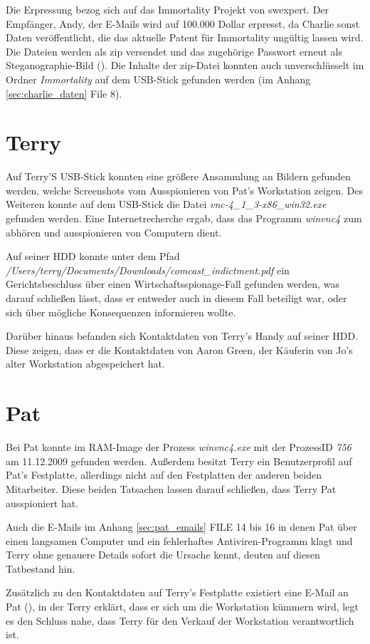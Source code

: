 Die Erpressung bezog sich auf das Immortality Projekt von swexpert. Der Empfänger, Andy, der E-Mails wird auf 100.000 Dollar erpresst, da Charlie sonst Daten veröffentlicht, die das aktuelle Patent für Immortality ungültig lassen wird. Die Dateien werden als zip versendet und das zugehörige Passwort erneut als Steganographie-Bild (). Die Inhalte der zip-Datei konnten auch unverschlüsselt im Ordner \textit{Immortality} auf dem USB-Stick gefunden werden (im Anhang \ref{sec:charlie_daten} File 8).

\section{Terry}
\label{sec:terry}
Auf Terry'S USB-Stick konnten eine größere Ansammlung an Bildern gefunden werden, welche Screenshots vom Ausspionieren von Pat's Workstation zeigen. Des Weiteren konnte auf dem USB-Stick die Datei \textit{vnc-4_1_3-x86_win32.exe} gefunden werden. Eine Internetrecherche ergab, dass das Programm \textit{winvnc4} zum abhören und ausspionieren von Computern dient.

Auf seiner HDD konnte unter dem Pfad \textit{/Users/terry/Documents/Downloads/comcast_indictment.pdf} ein Gerichtsbeschluss über einen Wirtschaftsspionage-Fall gefunden werden, was darauf schließen lässt, dass er entweder auch in diesem Fall beteiligt war, oder sich über mögliche Konsequenzen informieren wollte.\newline

Darüber hinaus befanden sich Kontaktdaten von Terry's Handy auf seiner HDD. Diese zeigen, dass er die Kontaktdaten von Aaron Green, der Käuferin von Jo's alter Workstation abgespeichert hat.

\section{Pat}
\label{sec:pat}
Bei Pat konnte im RAM-Image der Prozess \textit{winvnc4.exe} mit der ProzessID \textit{756} am 11.12.2009 gefunden werden. Außerdem besitzt Terry ein Benutzerprofil auf Pat's Festplatte, allerdings nicht auf den Festplatten der anderen beiden Mitarbeiter. Diese beiden Tatsachen lassen darauf schließen, dass Terry Pat ausspioniert hat.

Auch die E-Mails im Anhang \ref{sec:pat_emails} FILE 14 bis 16 in denen Pat über einen langsamen Computer und ein fehlerhaftes Antiviren-Programm klagt und Terry ohne genauere Details sofort die Ursache kennt, deuten auf diesen Tatbestand hin.\newline

Zusätzlich zu den Kontaktdaten auf Terry's Festplatte existiert eine E-Mail an Pat (), in der Terry erklärt, dass er sich um die Workstation kümmern wird, legt es den Schluss nahe, dass Terry für den Verkauf der Workstation verantwortlich ist.

